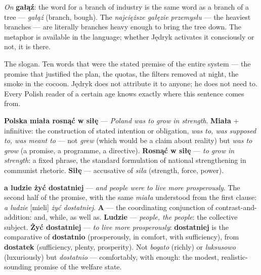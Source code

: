\medskip
\noindent\textit{On} \textbf{gałąź}: the word for
a branch of industry is the same word as a branch
of a tree --- \textit{gałąź} (branch, bough). The
\textit{najcięższe gałęzie przemysłu} --- the
heaviest branches --- are literally branches heavy
enough to bring the tree down. The metaphor is
available in the language; whether Jędryk activates
it consciously or not, it is there.



The slogan. Ten words that were the stated premise of
the entire system — the promise that justified the
plan, the quotas, the filters removed at night, the
smoke in the cocoon. Jędryk does not attribute it to
anyone; he does not need to. Every Polish reader of a
certain age knows exactly where this sentence comes from.

\textbf{Polska miała rosnąć w siłę} --- \textit{Poland
was to grow in strength}. \textbf{Miała} + infinitive:
the construction of stated intention or obligation,
\textit{was to, was supposed to, was meant to} ---
not \textit{grew} (which would be a claim about reality)
but \textit{was to grow} (a promise, a programme, a
directive). \textbf{Rosnąć w siłę} --- \textit{to grow
in strength}: a fixed phrase, the standard formulation
of national strengthening in communist rhetoric.
\textbf{Siłę} --- accusative of \textit{siła}
(strength, force, power).

\textbf{a ludzie żyć dostatniej} --- \textit{and people
were to live more prosperously}. The second half of
the promise, with the same \textit{miała} understood
from the first clause: \textit{a ludzie} [mieli]
\textit{żyć dostatniej}. \textbf{A} --- the
coordinating conjunction of contrast-and-addition:
and, while, as well as. \textbf{Ludzie} ---
\textit{people, the people}: the collective subject.
\textbf{Żyć dostatniej} --- \textit{to live more
prosperously}: \textbf{dostatniej} is the comparative
of \textbf{dostatnio} (prosperously, in comfort,
with sufficiency), from \textbf{dostatek}
(sufficiency, plenty, prosperity). Not \textit{bogato}
(richly) or \textit{luksusowo} (luxuriously) but
\textit{dostatnio} --- comfortably, with enough:
the modest, realistic-sounding promise of the
welfare state.

